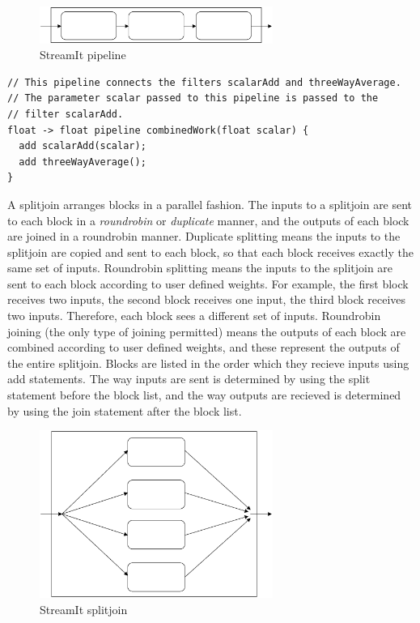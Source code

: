 \begin{figure}[bthp]
  \centering
  \includegraphics[width=3.0in]{figures/pipeline.eps}
  \caption{StreamIt pipeline}
  \label{fig:pipeline}
\end{figure}

\begin{scriptsize}
\begin{singlespace}
\begin{verbatim}
// This pipeline connects the filters scalarAdd and threeWayAverage.
// The parameter scalar passed to this pipeline is passed to the
// filter scalarAdd.
float -> float pipeline combinedWork(float scalar) {
  add scalarAdd(scalar);
  add threeWayAverage();
}
\end{verbatim}
\end{singlespace}
\end{scriptsize}

    A splitjoin arranges blocks in a parallel fashion.  The inputs to
a splitjoin are sent to each block in a \textit{roundrobin} or
\textit{duplicate} manner, and the outputs of each block are
joined in a roundrobin manner. Duplicate splitting means the
inputs to the splitjoin are copied and sent to each block, so that
each block receives exactly the same set of inputs.  Roundrobin
splitting means the inputs to the splitjoin are sent to each block
according to user defined weights.  For example, the first block
receives two inputs, the second block receives one input, the
third block receives two inputs.  Therefore, each block sees a
different set of inputs. Roundrobin joining (the only type of
joining permitted) means the outputs of each block are combined
according to user defined weights, and these represent the outputs
of the entire splitjoin. Blocks are listed in the order which they
recieve inputs using add statements. The way inputs are sent is
determined by using the split statement before the block list, and
the way outputs are recieved is determined by using the join
statement after the block list.

\begin{figure}[bthp]
  \centering
  \includegraphics[width=3.0in]{figures/splitjoin.eps}
  \caption{StreamIt splitjoin}
  \label{fig:splitjoin}
\end{figure}

